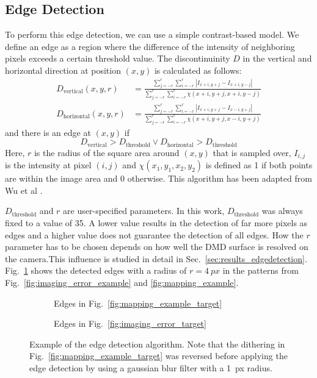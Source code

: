 \subsection{Edge Detection}
To perform this edge detection, we can use a simple contrast-based model. We define an edge as a region where the difference of the intensity of neighboring pixels exceeds a certain threshold value. The discontinuinity $D$ in the vertical and horizontal direction at position $(x,y)$ is calculated as follows:
\begin{align*}
    D_\text{vertical}(x,y,r) &= \frac{\sum_{j=-r}^{r} \sum_{i=-r}^{r} \left| I_{x+i,y+j} - I_{x+i,y-j} \right|}{\sum_{j=-r}^{r} \sum_{i=-r}^{r} \chi (x+i,y+j,x+i,y-j)} \\
    D_\text{horizontal}(x,y,r) &= \frac{\sum_{j=-r}^{r} \sum_{i=-r}^{r} \left| I_{x+i,y+j} - I_{x-i,y+j} \right|}{\sum_{j=-r}^{r} \sum_{i=-r}^{r} \chi (x+i,y+j,x-i,y+j)}
\end{align*}
and there is an edge at $(x,y)$ if
\begin{equation*}
    D_\text{vertical} > D_\text{threshold} \lor D_\text{horizontal} > D_\text{threshold}
\end{equation*}
Here, $r$ is the radius of the square area around $(x,y)$ that is sampled over, $I_{i,j}$ is the intensity at pixel $(i,j)$ and $\chi(x_1,y_1,x_2,y_2)$ is defined as 1 if both points are within the image area and 0 otherwise. This algorithm has been adapted from Wu et al \cite{wu:2015}. 

$D_\text{threshold}$ and $r$ are user-specified parameters. In this work, $D_\text{threshold}$ was always fixed to a value of 35. A lower value results in the detection of far more pixels as edges and a higher value does not guarantee the detection of all edges. How the $r$ parameter has to be chosen depends on how well the DMD surface is resolved on the camera.This influence is studied in detail in Sec.~\ref{sec:results_edgedetection}.
Fig.~\ref{fig:edge_detection_example} shows the detected edges with a radius of $r=\SI{4}{px}$ in the patterns from Fig.~\ref{fig:imaging_error_example} and \ref{fig:mapping_example}.
\begin{figure}[htbp]
    \centering
    \begin{subfigure}[t]{0.43\textwidth}
        \centering
        \caption{Edges in Fig.~\ref{fig:mapping_example_target}}
    \end{subfigure}
    \begin{subfigure}[t]{0.43\textwidth}
        \centering
        \caption{Edges in Fig.~\ref{fig:imaging_error_target}}
    \end{subfigure}
    \caption[Example of the edge detection algorithm]{Example of the edge detection algorithm. Note that the dithering in Fig.~\ref{fig:mapping_example_target} was reversed before applying the edge detection by using a gaussian blur filter with a \SI{1}{px} radius.}
    \label{fig:edge_detection_example}      
\end{figure}


